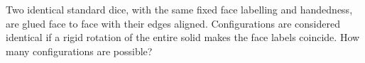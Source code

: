 Two identical standard dice, with the same fixed face labelling and handedness, are glued face to face with their edges aligned. Configurations are considered identical if a rigid rotation of the entire solid makes the face labels coincide. How many configurations are possible?

